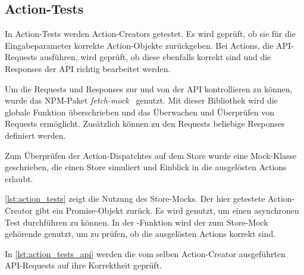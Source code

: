 \subsection{Action-Tests}
\label{sec:tf_action_tests}

In Action-Tests werden Action-Creators getestet.  Es wird geprüft, ob sie für
die Eingabeparameter korrekte Action-Objekte zurückgeben.  Bei Actions, die
API-Requests ausführen, wird geprüft, ob diese ebenfalls korrekt sind und die
Responses der API richtig bearbeitet werden.

Um die Requests und Responses zur und von der API kontrollieren zu können, wurde
das NPM-Paket \emph{fetch-mock}~\cite{fetch-mock} genutzt.  Mit dieser
Bibliothek wird die globale Funktion  überschrieben und das
Überwachen und Überprüfen von Requests ermöglicht.  Zusätzlich können zu den
Requests beliebige Responses definiert werden.

Zum Überprüfen der Action-Dispatchtes auf dem Store wurde eine Mock-Klasse
geschrieben, die einen Store simuliert und Einblick in die ausgelösten Actions
erlaubt.

\cref{lst:action_tests} zeigt die Nutzung des Store-Mocks.  Der hier getestete
Action-Creator  gibt ein Promise-Objekt zurück.  Es wird genutzt, um
einen asynchronen Test durchführen zu können.  In der -Funktion
wird der zum Store-Mock gehörende  genutzt, um zu prüfen,
ob die ausgelösten Actions korrekt sind.



In \cref{lst:action_tests_api} werden die vom selben Action-Creator ausgeführten
API-Requests auf ihre Korrektheit geprüft.



